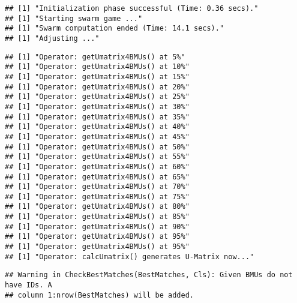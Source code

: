 \documentclass[
]{article}
\newenvironment{Shaded}{\begin{snugshade}}{\end{snugshade}}
\newcommand{\AttributeTok}[1]{\textcolor[rgb]{0.13,0.29,0.53}{#1}}
\newcommand{\FunctionTok}[1]{\textcolor[rgb]{0.13,0.29,0.53}{\textbf{#1}}}
\newcommand{\NormalTok}[1]{#1}
\newcommand{\OtherTok}[1]{\textcolor[rgb]{0.56,0.35,0.01}{#1}}
\newcommand{\SpecialCharTok}[1]{\textcolor[rgb]{0.81,0.36,0.00}{\textbf{#1}}}
\begin{document}
\begin{verbatim}
## [1] "Initialization phase successful (Time: 0.36 secs)."
## [1] "Starting swarm game ..."
## [1] "Swarm computation ended (Time: 14.1 secs)."
## [1] "Adjusting ..."
\end{verbatim}

\begin{Shaded}
\end{Shaded}

\begin{verbatim}
## [1] "Operator: getUmatrix4BMUs() at 5%"
## [1] "Operator: getUmatrix4BMUs() at 10%"
## [1] "Operator: getUmatrix4BMUs() at 15%"
## [1] "Operator: getUmatrix4BMUs() at 20%"
## [1] "Operator: getUmatrix4BMUs() at 25%"
## [1] "Operator: getUmatrix4BMUs() at 30%"
## [1] "Operator: getUmatrix4BMUs() at 35%"
## [1] "Operator: getUmatrix4BMUs() at 40%"
## [1] "Operator: getUmatrix4BMUs() at 45%"
## [1] "Operator: getUmatrix4BMUs() at 50%"
## [1] "Operator: getUmatrix4BMUs() at 55%"
## [1] "Operator: getUmatrix4BMUs() at 60%"
## [1] "Operator: getUmatrix4BMUs() at 65%"
## [1] "Operator: getUmatrix4BMUs() at 70%"
## [1] "Operator: getUmatrix4BMUs() at 75%"
## [1] "Operator: getUmatrix4BMUs() at 80%"
## [1] "Operator: getUmatrix4BMUs() at 85%"
## [1] "Operator: getUmatrix4BMUs() at 90%"
## [1] "Operator: getUmatrix4BMUs() at 95%"
## [1] "Operator: getUmatrix4BMUs() at 95%"
## [1] "Operator: calcUmatrix() generates U-Matrix now..."
\end{verbatim}

\begin{Shaded}
\end{Shaded}

\begin{verbatim}
## Warning in CheckBestMatches(BestMatches, Cls): Given BMUs do not have IDs. A
## column 1:nrow(BestMatches) will be added.
\end{verbatim}
\end{document}
